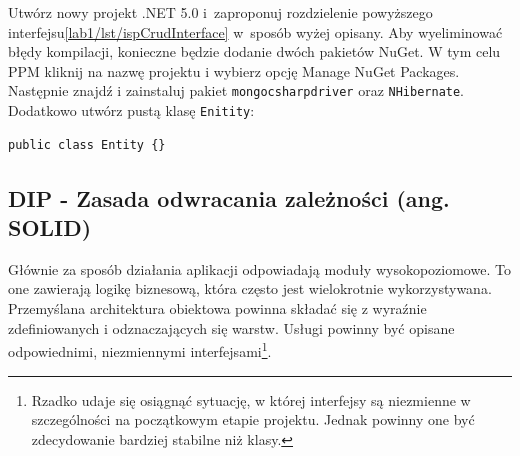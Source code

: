 Utwórz nowy projekt .NET 5.0 i~zaproponuj rozdzielenie powyższego interfejsu\ref{lab1/lst/ispCrudInterface} w~sposób wyżej opisany. Aby wyeliminować błędy kompilacji, konieczne będzie dodanie dwóch pakietów NuGet. W tym celu PPM kliknij na nazwę projektu i wybierz opcję Manage NuGet Packages. Następnie znajdź i zainstaluj pakiet \texttt{mongocsharpdriver} oraz \texttt{NHibernate}. Dodatkowo utwórz pustą klasę \texttt{Enitity}:
\begin{lstlisting}
public class Entity {}
\end{lstlisting}
%
%


\subsection{DIP - Zasada odwracania zależności (ang. SOLI\textbf{D})}\label{lab1/sec/dip}

Głównie za sposób działania aplikacji odpowiadają moduły wysokopoziomowe. To one zawierają logikę biznesową, która często jest wielokrotnie wykorzystywana. Przemyślana architektura obiektowa powinna składać się z wyraźnie zdefiniowanych i odznaczających się warstw. Usługi powinny być opisane odpowiednimi, niezmiennymi interfejsami\footnote{Rzadko udaje się osiągnąć sytuację, w której interfejsy są niezmienne w szczególności na początkowym etapie projektu. Jednak powinny one być zdecydowanie bardziej stabilne niż klasy.}.

